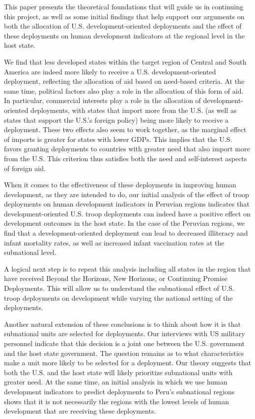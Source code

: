 \documentclass[12pt]{article}
\begin{document}
\begin{doublespace}
This paper presents the theoretical foundations that will guide us in continuing this project, as well as some initial findings that help support our arguments on both the allocation of U.S. development-oriented deployments and the effect of these deployments on human development indicators at the regional level in the host state.

We find that less developed states within the target region of Central and South America are indeed more likely to receive a U.S. development-oriented deployment, reflecting the allocation of aid based on need-based criteria.  At the same time, political factors also play a role in the allocation of this form of aid. In particular, commercial interests play a role in the allocation of development-oriented deployments, with states that import more from the U.S. (as well as states that support the U.S.'s foreign policy) being more likely to receive a deployment.  These two effects also seem to work together, as the marginal effect of imports is greater for states with lower GDPs.  This implies that the U.S. favors granting deployments to countries with greater need that also import more from the U.S.  This criterion thus satisfies both the need and self-interest aspects of foreign aid. 

When it comes to the effectiveness of these deployments in improving human development, as they are intended to do, our initial analysis of the effect of troop deployments on human development indicators in Peruvian regions indicates that development-oriented U.S. troop deployments can indeed have a positive effect on development outcomes in the host state.  In the case of the Peruvian regions, we find that a development-oriented deployment can lead to decreased illiteracy and infant mortality rates, as well as increased infant vaccination rates at the subnational level. 

A logical next step is to repeat this analysis including all states in the region that have received Beyond the Horizons, New Horizons, or Continuing Promise Deployments.  This will allow us to understand the subnational effect of U.S. troop deployments on development while varying the national setting of the deployments.  

Another natural extension of these conclusions is to think about how it is that subnational units are selected for deployments.  Our interviews with US military personnel indicate that this decision is a joint one between the U.S. government and the host state government.  The question remains as to what characteristics make a unit more likely to be selected for a deployment.  Our theory suggests that both the U.S. and the host state will likely prioritize subnational units with greater need.  At the same time, an initial analysis in which we use human development indicators to predict deployments to Peru's subnational regions shows that it is not necessarily the regions with the lowest levels of human development that are receiving these deployments.


\end{doublespace}
\end{document}
